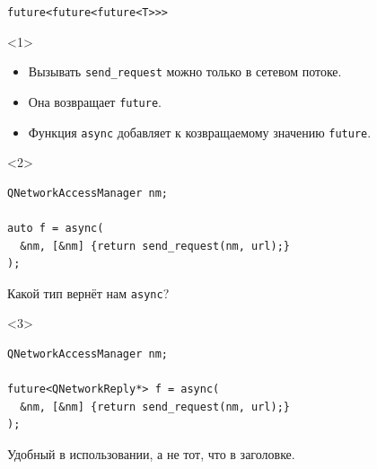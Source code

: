 \documentclass[aspectratio=169,hyperref={unicode},17pt]{beamer}
\begin{document}
\begin{frame}[fragile,t]{\texttt{future<future<future<T>{}>{}>}}
\begin{onlyenv}<1>
\begin{itemize}
 \item Вызывать \texttt{send\_request} можно только в сетевом потоке.
 \item Она возвращает \texttt{future}.
 \item Функция \texttt{async} добавляет к козвращаемому значению \texttt{future}.
\end{itemize}
\end{onlyenv}
\begin{onlyenv}<2>
\begin{lstlisting}[style=cppcode]
QNetworkAccessManager nm;

auto f = async(
  &nm, [&nm] {return send_request(nm, url);}
);
\end{lstlisting}
Какой тип вернёт нам \texttt{async}?
\end{onlyenv}
\begin{onlyenv}<3>
\begin{lstlisting}[style=cppcode]
QNetworkAccessManager nm;

future<QNetworkReply*> f = async(
  &nm, [&nm] {return send_request(nm, url);}
);
\end{lstlisting}
Удобный в использовании, а не тот, что в заголовке.
\end{onlyenv}
\end{frame}
\end{document}
